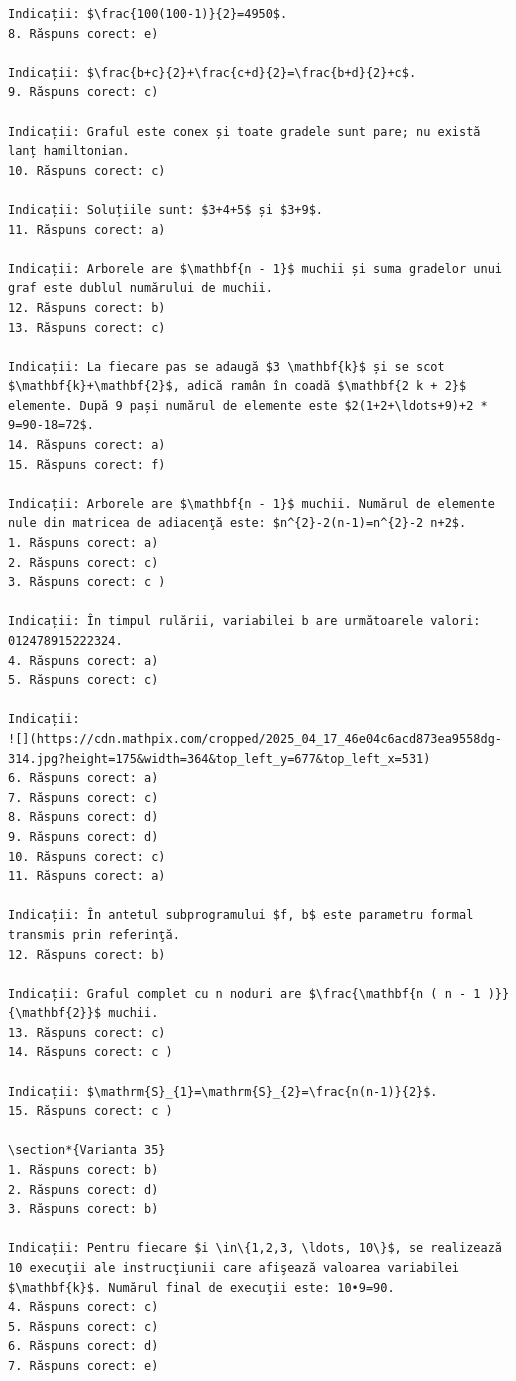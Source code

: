 \documentclass[10pt]{article}
\begin{document}
\begin{verbatim}
Indicații: $\frac{100(100-1)}{2}=4950$.
8. Răspuns corect: e)

Indicații: $\frac{b+c}{2}+\frac{c+d}{2}=\frac{b+d}{2}+c$.
9. Răspuns corect: c)

Indicații: Graful este conex și toate gradele sunt pare; nu există lanț hamiltonian.
10. Răspuns corect: c)

Indicații: Soluțiile sunt: $3+4+5$ și $3+9$.
11. Răspuns corect: a)

Indicații: Arborele are $\mathbf{n - 1}$ muchii și suma gradelor unui graf este dublul numărului de muchii.
12. Răspuns corect: b)
13. Răspuns corect: c)

Indicații: La fiecare pas se adaugă $3 \mathbf{k}$ și se scot $\mathbf{k}+\mathbf{2}$, adică ramân în coadă $\mathbf{2 k + 2}$ elemente. După 9 pași numărul de elemente este $2(1+2+\ldots+9)+2 * 9=90-18=72$.
14. Răspuns corect: a)
15. Răspuns corect: f)

Indicații: Arborele are $\mathbf{n - 1}$ muchii. Numărul de elemente nule din matricea de adiacenţă este: $n^{2}-2(n-1)=n^{2}-2 n+2$.
1. Răspuns corect: a)
2. Răspuns corect: c)
3. Răspuns corect: c )

Indicații: În timpul rulării, variabilei b are următoarele valori:
012478915222324.
4. Răspuns corect: a)
5. Răspuns corect: c)

Indicații:
![](https://cdn.mathpix.com/cropped/2025_04_17_46e04c6acd873ea9558dg-314.jpg?height=175&width=364&top_left_y=677&top_left_x=531)
6. Răspuns corect: a)
7. Răspuns corect: c)
8. Răspuns corect: d)
9. Răspuns corect: d)
10. Răspuns corect: c)
11. Răspuns corect: a)

Indicații: În antetul subprogramului $f, b$ este parametru formal transmis prin referinţă.
12. Răspuns corect: b)

Indicații: Graful complet cu n noduri are $\frac{\mathbf{n ( n - 1 )}}{\mathbf{2}}$ muchii.
13. Răspuns corect: c)
14. Răspuns corect: c )

Indicații: $\mathrm{S}_{1}=\mathrm{S}_{2}=\frac{n(n-1)}{2}$.
15. Răspuns corect: c )

\section*{Varianta 35}
1. Răspuns corect: b)
2. Răspuns corect: d)
3. Răspuns corect: b)

Indicații: Pentru fiecare $i \in\{1,2,3, \ldots, 10\}$, se realizează 10 execuţii ale instrucţiunii care afişează valoarea variabilei $\mathbf{k}$. Numărul final de execuţii este: 10•9=90.
4. Răspuns corect: c)
5. Răspuns corect: c)
6. Răspuns corect: d)
7. Răspuns corect: e)


\end{verbatim}
\end{document}

